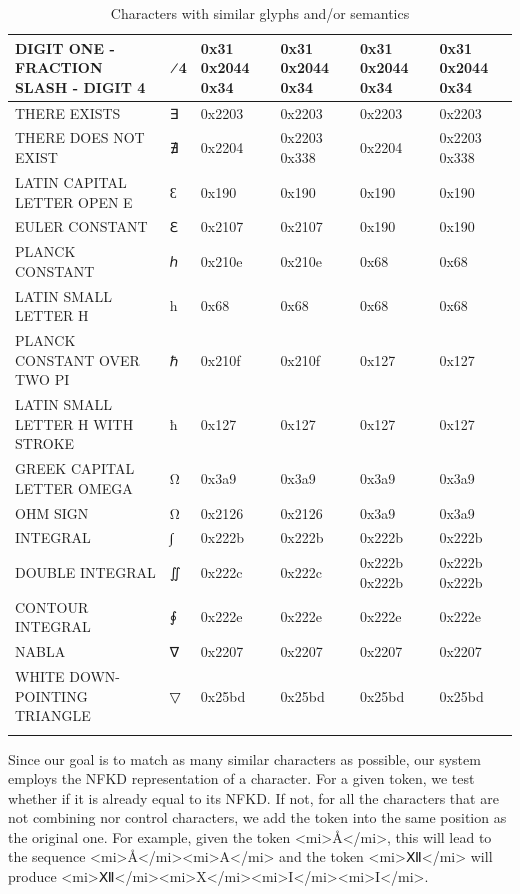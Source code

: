 \begin{longtable}{|m{4cm}|>{\centering\arraybackslash}m{2.15cm}|>{\centering\arraybackslash}m{1.65cm}|>{\centering\arraybackslash}m{1.65cm}|>{\centering\arraybackslash}m{1.65cm}|>{\centering\arraybackslash}m{1.65cm}|}
\hline
DIGIT ONE - FRACTION SLASH - DIGIT 4 & 1⁄4 &	0x31 0x2044 0x34 &	0x31 0x2044 0x34 &	0x31 0x2044 0x34 &	0x31 0x2044 0x34 \\
\hline
THERE EXISTS	& {\unicodefont ∃}&	0x2203 &	0x2203 &	0x2203 &	0x2203 \\
\hline
THERE DOES NOT EXIST	& {\unicodefont ∄} & 	0x2204	& 0x2203 0x338& 	0x2204 &	0x2203 0x338\\
\hline
LATIN CAPITAL LETTER OPEN E	& {\unicodefont Ɛ} &	0x190 &	0x190 &	0x190 &	0x190 \\
\hline
EULER CONSTANT	& {\unicodefont ℇ} & 0x2107 & 0x2107 & 0x190 & 0x190 \\
\hline
PLANCK CONSTANT	& {\unicodefont ℎ} &	0x210e &	0x210e &	0x68 &	0x68 \\
\hline
LATIN SMALL LETTER H &	h &	0x68 &	0x68 &	0x68 &	0x68 \\
\hline
PLANCK CONSTANT OVER TWO PI	& {\unicodefont ℏ} &	0x210f &	0x210f	& 0x127 &	0x127 \\
\hline
LATIN SMALL LETTER H WITH STROKE & ħ &	0x127	& 0x127	& 0x127	& 0x127 \\
\hline
GREEK CAPITAL LETTER OMEGA	& Ω &	0x3a9 &	0x3a9 &	0x3a9 &	0x3a9 \\
\hline
OHM SIGN & Ω &	0x2126 &	0x2126 &	0x3a9 &	0x3a9 \\
\hline
INTEGRAL & {\unicodefont ∫} &	0x222b &	0x222b &	0x222b &	0x222b \\
\hline
DOUBLE INTEGRAL	& {\unicodefont ∬} & 	0x222c &	0x222c &	0x222b 0x222b &	0x222b 0x222b \\
\hline
CONTOUR INTEGRAL	& {\unicodefont ∮} &	0x222e	 &0x222e &	0x222e &	0x222e \\
\hline
NABLA	& {\unicodefont ∇} &	0x2207	 &0x2207 &	0x2207 &	0x2207 \\
\hline
WHITE DOWN-POINTING TRIANGLE	& {\unicodefont ▽} &	0x25bd	 &0x25bd &	0x25bd &	0x25bd \\
\hline

\caption{Characters with similar glyphs and/or semantics}
\label{unicode_characters}
\end{longtable}


Since our goal is to match as many similar characters as possible, our system employs the NFKD representation of a character. For a given token, we test whether if it is already equal to its NFKD. If not, for all the characters that are not combining nor control characters, we add the token into the same position as the original one.
For example, given the token <mi>\r{A}</mi>, this will lead to the sequence <mi>\r{A}</mi><mi>A</mi> and the token <mi>{\unicodefontⅫ}</mi> will produce <mi>{\unicodefontⅫ}</mi><mi>X</mi><mi>I</mi><mi>I</mi>.

